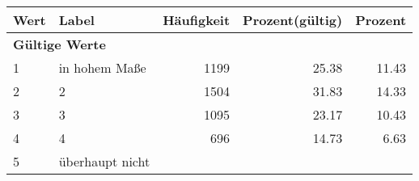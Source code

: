      \begin{longtable}{lXrrr}
     \toprule
     \textbf{Wert} & \textbf{Label} & \textbf{Häufigkeit} & \textbf{Prozent(gültig)} & \textbf{Prozent} \\
     \endhead
     \midrule
     \multicolumn{5}{l}{\textbf{Gültige Werte}}\\

     1 &
     \multicolumn{1}{X}{ in hohem Maße   } &


       \num{1199} &
       \num[round-mode=places,round-precision=2]{25,38} &
         \num[round-mode=places,round-precision=2]{11,43} \\

     2 &
     \multicolumn{1}{X}{ 2   } &


       \num{1504} &
       \num[round-mode=places,round-precision=2]{31,83} &
         \num[round-mode=places,round-precision=2]{14,33} \\

     3 &
     \multicolumn{1}{X}{ 3   } &


       \num{1095} &
       \num[round-mode=places,round-precision=2]{23,17} &
         \num[round-mode=places,round-precision=2]{10,43} \\

     4 &
     \multicolumn{1}{X}{ 4   } &


       \num{696} &
       \num[round-mode=places,round-precision=2]{14,73} &
         \num[round-mode=places,round-precision=2]{6,63} \\

     5 &
     \multicolumn{1}{X}{ überhaupt nicht   } &



\end{longtable}
